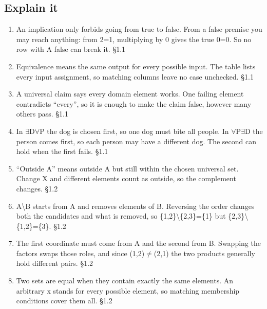 \documentclass[11pt]{article}
\begin{document}
\begin{keepsection}\subsection{Explain it}

\begin{enumerate}
\item An implication only forbids going from true to false. From a false premise you may reach anything: from 2=1, multiplying by 0 gives the true 0=0. So no row with A false can break it. \hfill{\small\color{FAUblue}§1.1}
\item Equivalence means the same output for every possible input. The table lists every input assignment, so matching columns leave no case unchecked. \hfill{\small\color{FAUblue}§1.1}
\item A universal claim says every domain element works. One failing element contradicts “every”, so it is enough to make the claim false, however many others pass. \hfill{\small\color{FAUblue}§1.1}
\item In \ensuremath{\exists}D\ensuremath{\forall}P the dog is chosen first, so one dog must bite all people. In \ensuremath{\forall}P\ensuremath{\exists}D the person comes first, so each person may have a different dog. The second can hold when the first fails. \hfill{\small\color{FAUblue}§1.1}
\item “Outside A” means outside A but still within the chosen universal set. Change X and different elements count as outside, so the complement changes. \hfill{\small\color{FAUblue}§1.2}
\item A\textbackslash{}B starts from A and removes elements of B. Reversing the order changes both the candidates and what is removed, so \{1,2\}\textbackslash{}\{2,3\}=\{1\} but \{2,3\}\textbackslash{}\{1,2\}=\{3\}. \hfill{\small\color{FAUblue}§1.2}
\item The first coordinate must come from A and the second from B. Swapping the factors swaps those roles, and since (1,2)\ensuremath{\neq}(2,1) the two products generally hold different pairs. \hfill{\small\color{FAUblue}§1.2}
\item Two sets are equal when they contain exactly the same elements. An arbitrary x stands for every possible element, so matching membership conditions cover them all. \hfill{\small\color{FAUblue}§1.2}
\end{enumerate}

\end{keepsection}
\end{document}
